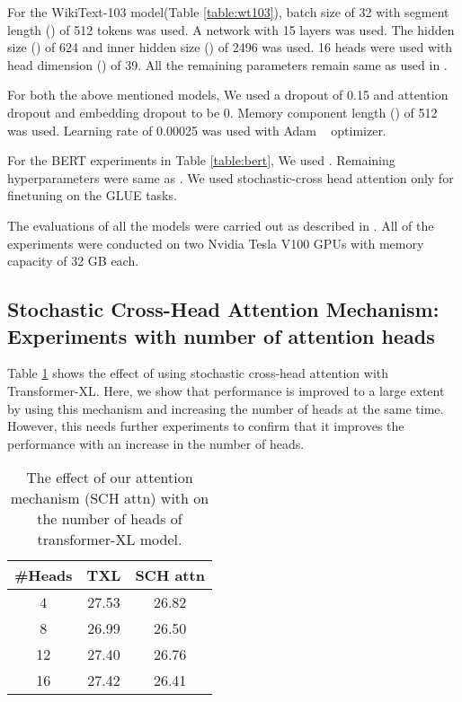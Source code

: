 \documentclass[11pt]{article}
\begin{document}
For the WikiText-103 model(Table \ref{table:wt103}), batch size of 32 with segment length () of 512 tokens was used. A network with 15 layers was used. The hidden size () of 624 and inner hidden size () of 2496 was used.  16 heads were used with head dimension () of 39. All the remaining parameters remain same as used in . 

For both the above mentioned models, We used a dropout of 0.15 and attention dropout and embedding dropout to be 0. Memory component length () of 512 was used. Learning rate of 0.00025 was used with Adam ~\citep{DBLP:journals/corr/KingmaB14} optimizer.

For the BERT experiments in Table \ref{table:bert}, We used . Remaining hyperparameters were same as \citet{DBLP:conf/naacl/DevlinCLT19}. We used stochastic-cross head attention only for finetuning on the GLUE tasks. 




The evaluations of all the models were carried out as described in . All of the experiments were conducted on two Nvidia Tesla V100 GPUs with memory capacity of 32 GB each. 


\subsection{Stochastic Cross-Head Attention Mechanism: Experiments with number of attention heads}


Table \ref{table:headwt103} shows the effect of using stochastic cross-head attention with Transformer-XL. Here, we show that performance is improved to a large extent by using this mechanism and increasing the number of heads at the same time. However, this needs further experiments to confirm that it improves the performance with an increase in the number of heads.



\begin{table}
\centering
\begin{tabular}{ccc}
\hline \textbf{\#Heads} & \textbf{TXL} & \textbf{SCH attn} \\ \hline
4  & 27.53 & 26.82\\

8 & 26.99 &  26.50 \\
12  &  27.40 & 26.76 \\
16 &  27.42 & 26.41 \\
\hline
\end{tabular}
\caption{ The effect of our attention mechanism (SCH attn) with  on the number of heads of transformer-XL model.}
\label{table:headwt103}
\end{table}
\end{document}
